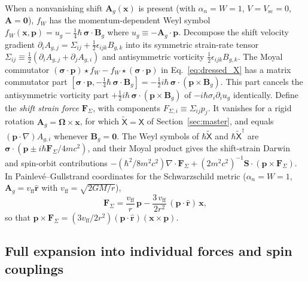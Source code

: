 \documentclass[aps,prd,onecolumn,tightenlines,nofootinbib,notitlepage,11pt,floatfix]{revtex4-2}
\theoremstyle{indentedtheorem}
\begin{document}
When a nonvanishing shift $\mathbf{A}_g(\mathbf{x})$ is present (with $\alpha_n=W=1$, $V=V_\text{sc}=0$, $\mathbf{A}=\mathbf{0}$), $f_W$ has the momentum-dependent Weyl symbol $f_W(\mathbf{x},\mathbf{p}) = u_g - \tfrac{1}{4}\hbar\,\boldsymbol{\sigma}\cdot\mathbf{B}_g$ where $u_g \equiv -\mathbf{A}_g\cdot\mathbf{p}$. Decompose the shift velocity gradient $\partial_i A_{g,j} = \Sigma_{ij} + \tfrac{1}{2}\epsilon_{ijk}B_{g,k}$ into its symmetric strain-rate tensor $\Sigma_{ij} \equiv \tfrac{1}{2}(\partial_i A_{g,j}+\partial_j A_{g,i})$ and antisymmetric vorticity $\tfrac{1}{2}\epsilon_{ijk}B_{g,k}$. The Moyal commutator $(\boldsymbol{\sigma}\cdot\mathbf{p})\star f_W - f_W\star(\boldsymbol{\sigma}\cdot\mathbf{p})$ in Eq.~\eqref{eq:dressed_X} has a matrix commutator part $[{\boldsymbol{\sigma}\cdot\mathbf{p}}, -\tfrac{1}{4}\hbar\,\boldsymbol{\sigma}\cdot\mathbf{B}_g] = -\tfrac{1}{2}i\hbar\,\boldsymbol{\sigma}\cdot(\mathbf{p}\times\mathbf{B}_g)$. This part cancels the antisymmetric vorticity part $+\tfrac{1}{2}i\hbar\,\boldsymbol{\sigma}\cdot(\mathbf{p}\times\mathbf{B}_g)$ of $-i\hbar\sigma_i\partial_i u_g$ identically. Define the \emph{shift strain force} $\mathbf{F}_\Sigma$, with components $F_{\Sigma,i} \equiv \Sigma_{ij}p_j$. It vanishes for a rigid rotation $\mathbf{A}_g = \boldsymbol{\Omega}\times\mathbf{x}$, for which $\tilde{\mathsf{X}}=\mathsf{X}$ of Section~\ref{sec:master}, and equals $(\mathbf{p}\cdot\nabla)A_{g,i}$ whenever $\mathbf{B}_g=\mathbf{0}$. The Weyl symbols of $\hbar\tilde{\mathsf{X}}$ and $\hbar\tilde{\mathsf{X}}^\dagger$ are $\boldsymbol{\sigma}\cdot(\mathbf{p}\pm i\hbar\mathbf{F}_\Sigma/4mc^2)$, and their Moyal product gives the shift-strain Darwin and spin-orbit contributions $-(\hbar^2/8m^2c^2)\nabla\cdot\mathbf{F}_\Sigma + (2m^2c^2)^{-1}\mathbf{S}\cdot(\mathbf{p}\times\mathbf{F}_\Sigma)$. In Painlev\'e--Gullstrand coordinates for the Schwarzschild metric ($\alpha_n=W=1$, $\mathbf{A}_g = v_\text{ff}\hat{\mathbf{r}}$ with $v_\text{ff}=\sqrt{2GM/r}$),
\begin{equation}
    \mathbf{F}_\Sigma = \frac{v_\text{ff}}{r}\,\mathbf{p} - \frac{3\,v_\text{ff}}{2r^2}\,(\mathbf{p}\cdot\hat{\mathbf{r}})\,\mathbf{x} ,
    \label{eq:pg_F}
\end{equation}
so that $\mathbf{p}\times\mathbf{F}_\Sigma = (3v_\text{ff}/2r^2)(\mathbf{p}\cdot\hat{\mathbf{r}})(\mathbf{x}\times\mathbf{p})$.

\subsection{Full expansion into individual forces and spin couplings}
\label{sec:full_force_expansion}
\end{document}
